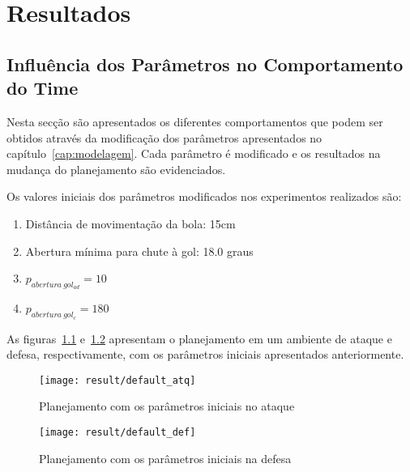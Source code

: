 \chapter{Resultados}\label{cap:resultados}



\section{Influência dos Parâmetros no Comportamento do Time}

Nesta secção são apresentados os diferentes comportamentos
que podem ser obtidos através da modificação dos parâmetros
apresentados no capítulo~\ref{cap:modelagem}. Cada parâmetro
é modificado e os resultados na mudança do planejamento são
evidenciados.

Os valores iniciais dos parâmetros modificados nos experimentos
realizados são:

\begin{enumerate}
  \item Distância de movimentação da bola: 15cm
  \item Abertura mínima para chute à gol: 18.0 graus
  \item $p_{abertura{\ }gol_{ad}} = 10$
  \item $p_{abertura{\ }gol_{c}} = 180$
\end{enumerate}

As figuras~\ref{fig:default_atq} e~\ref{fig:default_def} apresentam
o planejamento em um ambiente de ataque e defesa, respectivamente,
com os parâmetros iniciais apresentados anteriormente.

\begin{figure}[H]
  \centering
  \texttt{[image: result/default\_atq]}
  \caption{Planejamento com os parâmetros iniciais no
           ataque}\label{fig:default_atq}
\end{figure}
\begin{figure}[H]
  \centering
  \texttt{[image: result/default\_def]}
  \caption{Planejamento com os parâmetros iniciais
           na defesa}\label{fig:default_def}
\end{figure}

